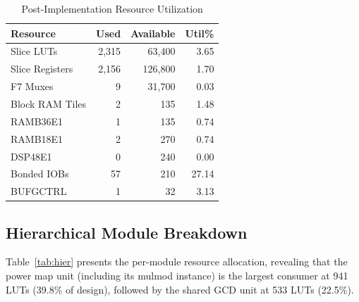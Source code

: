 \documentclass[lettersize,journal]{IEEEtran}
\begin{document}
\begin{table}[!t]
\caption{Post-Implementation Resource Utilization\label{tab:util}}
\centering
\begin{tabular}{@{}lrrr@{}}
\toprule
\textbf{Resource} & \textbf{Used} & \textbf{Available} & \textbf{Util\%} \\
\midrule
Slice LUTs              & 2{,}315 & 63{,}400  & 3.65 \\
Slice Registers         & 2{,}156 & 126{,}800 & 1.70 \\
F7 Muxes                & 9       & 31{,}700  & 0.03 \\
Block RAM Tiles         & 2       & 135       & 1.48 \\
\quad RAMB36E1           & 1       & 135       & 0.74 \\
\quad RAMB18E1           & 2       & 270       & 0.74 \\
DSP48E1                 & 0       & 240       & 0.00 \\
Bonded IOBs             & 57      & 210       & 27.14 \\
BUFGCTRL                & 1       & 32        & 3.13 \\
\bottomrule
\end{tabular}
\end{table}

\subsection{Hierarchical Module Breakdown}

Table~\ref{tab:hier} presents the per-module resource allocation, revealing that the power map unit (including its mulmod instance) is the largest consumer at 941 LUTs (39.8\% of design), followed by the shared GCD unit at 533 LUTs (22.5\%).
\end{document}
